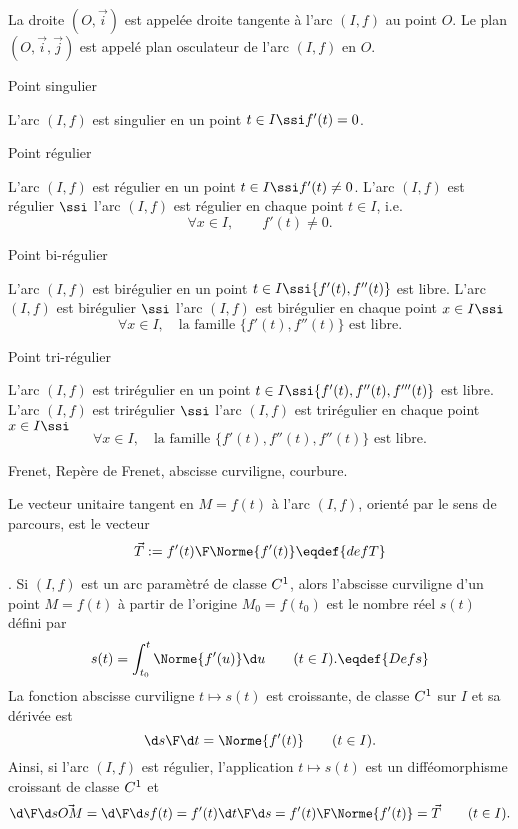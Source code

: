 \Definition 
La droite $(O,\vec i)$ est appel\'ee droite tangente \`a l'arc $(I,f)$ au point $O$. \PAR\noindent
Le plan $(O,\vec i,\vec j)$ est appel\'e plan osculateur de l'arc $(I,f)$ en $O$. 

\Concept Point singulier

L'arc $(I,f)$ est singulier en un point $t\in I \ssi f'(t)=0$. 

\Concept Point r\'egulier

L'arc $(I,f)$ est r\'egulier en un point $t\in I \ssi f'(t)\neq 0$. \PAR\noindent
L'arc $(I,f)$ est r\'egulier $\ssi$ l'arc $(I,f)$ est r\'egulier en chaque point $t\in I$, i.e. 
$$
\forall x\in I, \qquad f'(t)\neq 0.
$$

\Concept Point bi-r\'egulier

L'arc $(I,f)$ est bir\'egulier en un point $t\in I\ssi\{f'(t), f''(t)\}$ est libre. \medskip\noindent 
L'arc $(I,f)$ est bir\'egulier $\ssi$ l'arc $(I,f)$ est bir\'egulier en chaque point $x\in I\ssi$
$$
\forall x\in I,\quad \mbox{la famille }\{f'(t),f''(t)\} \mbox{ est libre}.
$$

\Concept Point tri-r\'egulier

L'arc $(I,f)$ est trir\'egulier en un point $t\in I\ssi\{f'(t), f''(t),f'''(t)\}$ est libre. \medskip\noindent
L'arc $(I,f)$ est trir\'egulier $\ssi$ l'arc $(I,f)$ est trir\'egulier en chaque point $x\in I\ssi$
$$
\forall x\in I,\quad \mbox{la famille }\{f'(t),f''(t),f''(t)\} \mbox{ est libre}.
$$

%

\Subsection Frenet, Rep\`ere de Frenet, abscisse curviligne, courbure.

Le vecteur unitaire tangent en $M=f(t)$ \`a l'arc $(I,f)$, orient\'e par le sens de parcours, est le vecteur 
$$
\vec T:={f'(t)\F\Norme{f'(t)}}\eqdef{defT}
$$

\Rappels. Si $(I,f)$ est un arc param\`etr\'e de classe $\sc C^1$, alors l'abscisse curviligne d'un point $M=f(t)$ \`a partir de l'origine $M_0=f(t_0)$ 
est le nombre r\'eel $s(t)$ d\'efini par 
$$
s(t)=\int_{t_0}^t\Norme{f'(u)}\d u\qquad (t\in I). \eqdef{Defs}
$$
La fonction abscisse curviligne $t\mapsto s(t)$ est croissante, de classe $\sc C^1$ sur $I$ et sa d\'eriv\'ee est 
$$
{\d s\F\d t}=\Norme{f'(t)}\qquad(t\in I).
$$
Ainsi, si l'arc $(I,f)$ est r\'egulier, l'application $t\mapsto s(t)$ est un diff\'eomorphisme croissant de classe $\sc C^1$ et 
$$
{\d\F\d s}\vec{OM}={\d \F\d s}f(t)=f'(t){\d t\F\d s}={f'(t)\F\Norme{f'(t)}}=\vec T\qquad (t\in I).
$$




